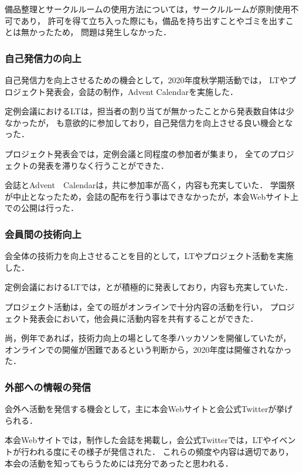     備品整理とサークルルームの使用方法については，サークルルームが原則使用不可であり，
    許可を得て立ち入った際にも，備品を持ち出すことやゴミを出すことは無かったため，
    問題は発生しなかった．

\subsubsection*{自己発信力の向上}
    自己発信力を向上させるための機会として，2020年度秋学期活動では，
    LTやプロジェクト発表会，会誌の制作，Advent Calendarを実施した．

    定例会議におけるLTは，担当者の割り当てが無かったことから発表数自体は少なかったが，
    \firstGrade{}も意欲的に参加しており，自己発信力を向上させる良い機会となった．

    プロジェクト発表会では，定例会議と同程度の参加者が集まり，
    全てのプロジェクトの発表を滞りなく行うことができた．

    会誌とAdvent　Calendarは，共に参加率が高く，内容も充実していた．
    学園祭が中止となったため，会誌の配布を行う事はできなかったが，本会Webサイト上での公開は行った．

\subsubsection*{会員間の技術向上}
    会全体の技術力を向上させることを目的として，LTやプロジェクト活動を実施した．

    定例会議におけるLTでは，\firstGrade{}と\secondGrade{}が積極的に発表しており，内容も充実していた．

    プロジェクト活動は，全ての班がオンラインで十分内容の活動を行い，
    プロジェクト発表会において，他会員に活動内容を共有することができた．

    尚，例年であれば，技術力向上の場として冬季ハッカソンを開催していたが，
    オンラインでの開催が困難であるという判断から，2020年度は開催されなかった．

\subsubsection*{外部への情報の発信}
    会外へ活動を発信する機会として，主に本会Webサイトと会公式Twitterが挙げられる．

    本会Webサイトでは，制作した会誌を掲載し，会公式Twitterでは，LTやイベントが行われる度にその様子が発信された．
    これらの頻度や内容は適切であり，本会の活動を知ってもらうためには充分であったと思われる．
